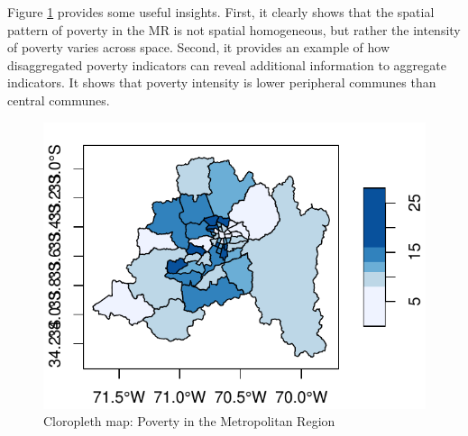 \begin{knitrout}
\color{fgcolor}\begin{kframe}
\begin{alltt}
\hlstd{(}\hlstd{)}
\hlstd{(mr[}\hlstd{],}
        \hlstd{=} \hlstd{,}
        \hlstd{=} \hlstd{,}
        \hlstd{=} \hlstd{(}\hlstd{,} \hlstd{),}
        \hlstd{=} \hlstd{,}
        \hlstd{=} \hlstd{)}
\end{alltt}
\end{kframe}
\end{knitrout}

Figure \ref{fig:cloro-graph} provides some useful insights. First, it clearly shows that the spatial pattern of poverty in the MR is not spatial homogeneous, but rather the intensity of poverty varies across space. Second, it provides an example of how disaggregated poverty indicators can reveal additional information to aggregate indicators. It shows that poverty intensity is lower peripheral communes than central communes. 

\begin{figure}
\caption{Cloropleth map: Poverty in the Metropolitan Region}\label{fig:cloro-graph}
\begin{knitrout}
\color{fgcolor}

{\centering \includegraphics[width=\maxwidth]{figure/cloro-graphs-1} 

}


\end{knitrout}
\end{figure}

